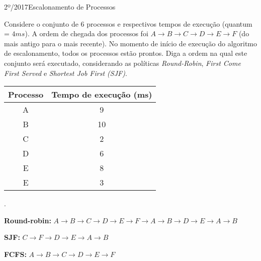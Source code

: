 \begin{exercicio}
  {2º/2017}{Escalonamento de Processos}
  {Considere o conjunto de $6$ processos e respectivos tempos de execução (quantum = $4 ms$). A ordem de chegada dos processos foi $A \rightarrow B \rightarrow C \rightarrow D \rightarrow E \rightarrow F$ (do mais antigo para o mais recente). No momento de início de execução do algoritmo de escalonamento, todos os processos estão prontos. Diga a ordem na qual este conjunto será executado, considerando as políticas \textit{Round-Robin}, \textit{First Come First Served} e \textit{Shortest Job First (SJF)}.
  \begin{table}[H]
    \centering
    \begin{tabular}{cc}
      \hline \hline
      \textbf{Processo} & \textbf{Tempo de execução (ms)} \\ \hline
      A                 & 9                               \\
      B                 & 10                              \\
      C                 & 2                               \\
      D                 & 6                               \\
      E                 & 8                               \\
      E                 & 3                              \\ \hline \hline
    \end{tabular}
  \end{table}.}

  \textbf{Round-robin:} $A \rightarrow B \rightarrow C \rightarrow D \rightarrow E \rightarrow F \rightarrow A \rightarrow B \rightarrow D \rightarrow E \rightarrow A \rightarrow B$

  \textbf{SJF:} $C \rightarrow F \rightarrow D \rightarrow E \rightarrow A \rightarrow B$

  \textbf{FCFS:} $A \rightarrow B \rightarrow C \rightarrow D \rightarrow E \rightarrow F$

\end{exercicio}

